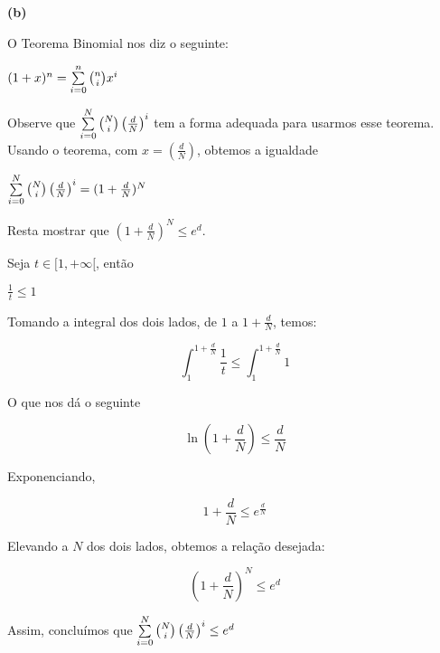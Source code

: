 \textbf{(b)}

O Teorema Binomial nos diz o seguinte:

$(1 + x)^n = \sum\limits_{i=0}^n {{n} \choose {i}} x^i$


Observe que $\sum\limits_{i=0}^{N}{{N} \choose {i}} \left( \frac{d}{N} \right)^{i}$ tem a forma adequada para usarmos esse teorema. Usando o teorema, com $x = \left( \frac{d}{N} \right)$, obtemos a igualdade

$\sum\limits_{i=0}^{N}{{N} \choose {i}} \left( \frac{d}{N} \right)^{i} = (1 + \frac{d}{N})^N$

Resta mostrar que $\left( 1 + \frac{d}{N} \right)^N \le e^d$.

Seja $t \in [1, +\infty[$, então

$\frac{1}{t} \le 1$

Tomando a integral dos dois lados, de $1$ a $1 + \frac{d}{N}$, temos:

$$ \int_{1}^{1 + \frac{d}{N}} \frac{1}{t} \le
\int_{1}^{1 + \frac{d}{N}} 1$$

O que nos dá o seguinte

$$ \ln(1 + \frac{d}{N}) \le \frac{d}{N} $$

Exponenciando,

$$1 + \frac{d}{N} \le e^{\frac{d}{N}}$$

Elevando a $N$ dos dois lados, obtemos a relação desejada:

$$ \left( 1 + \frac{d}{N} \right)^N \le e^d$$

Assim, concluímos que
$\sum\limits_{i=0}^{N}{{N} \choose {i}} 
\left( 
\frac{d}{N} \right)^{i} 
\le e^d$\cqd
